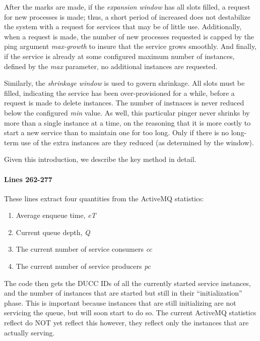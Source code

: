     After the marks are made, if the {\em expansion window} has all slots filled,
    a request for new processes is made; thus, a short period of increased does not
    destabilize the system with a request for services that may be of little use.  
    Additionally, when a request is made, the number of new processes requested is
    capped by the ping argument {\em max-growth} to insure that the service
    grows smoothly.  And finally, if the service is already at some configured maximum
    number of instances, defined by the {\em max} parameter, no additional instances
    are requested.

    Similarly, the {\em shrinkage window} is used to govern shrinkage.  All slots must be
    filled, indicating the service has been over-provisioned for a while, before a request
    is made to delete instances.  The number of instnaces is never reduced below the
    configured {\em min} value.  As well, this particular pinger never shrinks by more than
    a single instance at a time, on the reasoning that it is more costly to start a new
    service than to maintain one for too long.  Only if there is no long-term use of 
    the extra instances are they reduced (as
    determined by the window).

    Given this introduction, we describe the key method in detail.

    \paragraph{Lines 262-277}
    These lines extract four quantities from the ActiveMQ statistics:
    \begin{enumerate}
      \item Average enqueue time, {\em eT}
      \item Current queue depth, {\em Q}
      \item The current number of service consumers {\em cc}
      \item The current number of service producers {\em pc}
    \end{enumerate}

    The code then gets the DUCC IDs of all the currently started service
    instances, and the number of instances that are started but still in
    their ``initialization'' phase.  This is important because instances that
    are still initializing are not servicing the queue, but will soon start
    to do so.  The current ActiveMQ statistics reflect do NOT yet reflect
    this however, they reflect only the instances that are actually serving.

